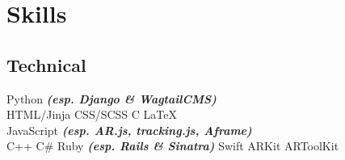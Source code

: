 \documentclass[a4paper]{deedy-resume} %
\begin{document}
\begin{minipage}[t]{0.33\textwidth}


\sectionspace
\section{Skills}

\subsection{Technical}

Python {\footnotesize \textit{\textbf{(esp. Django \& WagtailCMS)}}} \\
HTML/Jinja \textbullet{} CSS/SCSS \textbullet{} C \textbullet{} \LaTeX\  \textbullet{}\\
JavaScript {\footnotesize \textit{\textbf{(esp. AR.js, tracking.js, Aframe)}}} \\

C++ \textbullet{} C\# \textbullet{} Ruby {\footnotesize \textit{\textbf{(esp. Rails \& Sinatra)}}}
Swift \textbullet{} ARKit \textbullet{} ARToolKit \\


\end{minipage}
\end{document}
